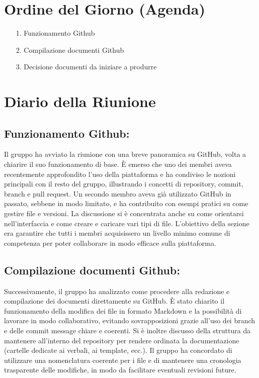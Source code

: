 \documentclass[a4paper, 11pt, oneside]{scrartcl} %
\begin{document}
\section{Ordine del Giorno (Agenda)}
\begin{itemize}
    \item[1.] Funzionamento Github
    \item[2.] Compilazione documenti Github
    \item[3.] Decisione documenti da iniziare a produrre
\end{itemize}

\newpage
\section{Diario della Riunione}

\subsection{Funzionamento Github:}
Il gruppo ha avviato la riunione con una breve panoramica su GitHub, volta a chiarire il suo funzionamento di base.
È emerso che uno dei membri aveva recentemente approfondito l’uso della piattaforma e ha condiviso le nozioni principali con il resto del gruppo, illustrando i concetti di repository, commit, branch e pull request.
Un secondo membro aveva già utilizzato GitHub in passato, sebbene in modo limitato, e ha contribuito con esempi pratici su come gestire file e versioni.
La discussione si è concentrata anche su come orientarsi nell’interfaccia e come creare e caricare vari tipi di file.
L’obiettivo della sezione era garantire che tutti i membri acquisissero un livello minimo comune di competenza per poter collaborare in modo efficace sulla piattaforma.

\subsection{Compilazione documenti Github:}
Successivamente, il gruppo ha analizzato come procedere alla redazione e compilazione dei documenti direttamente su GitHub.
È stato chiarito il funzionamento della modifica dei file in formato Markdown e la possibilità di lavorare in modo collaborativo, evitando sovrapposizioni grazie all’uso dei branch e delle commit message chiare e coerenti.
Si è inoltre discusso della struttura da mantenere all’interno del repository per rendere ordinata la documentazione (cartelle dedicate ai verbali, ai template, ecc.).
Il gruppo ha concordato di utilizzare una nomenclatura coerente per i file e di mantenere una cronologia trasparente delle modifiche, in modo da facilitare eventuali revisioni future.
\end{document}
